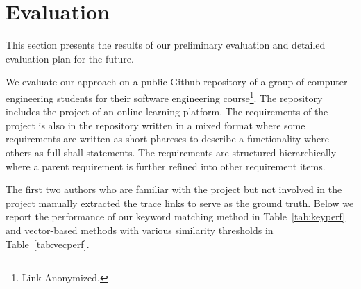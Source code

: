 \section{Evaluation}
\label{sec:eval}



This section presents the results of our preliminary evaluation and detailed evaluation plan for the future.

We evaluate our approach on a public Github repository of a group of computer engineering students for their software engineering course\footnote{Link Anonymized.%
}. The repository includes the project of an online learning platform. The requirements of the project is also in the repository written in a mixed format where some requirements are written as short phareses to describe a functionality where others as full shall statements. The requirements are structured hierarchically where a parent requirement is further refined into other requirement items.

The first two authors who are familiar with the project but not involved in the project manually extracted the trace links to serve as the ground truth. Below we report the performance of our keyword matching method in Table~\ref{tab:keyperf} and vector-based methods with various similarity thresholds in Table~\ref{tab:vecperf}.




